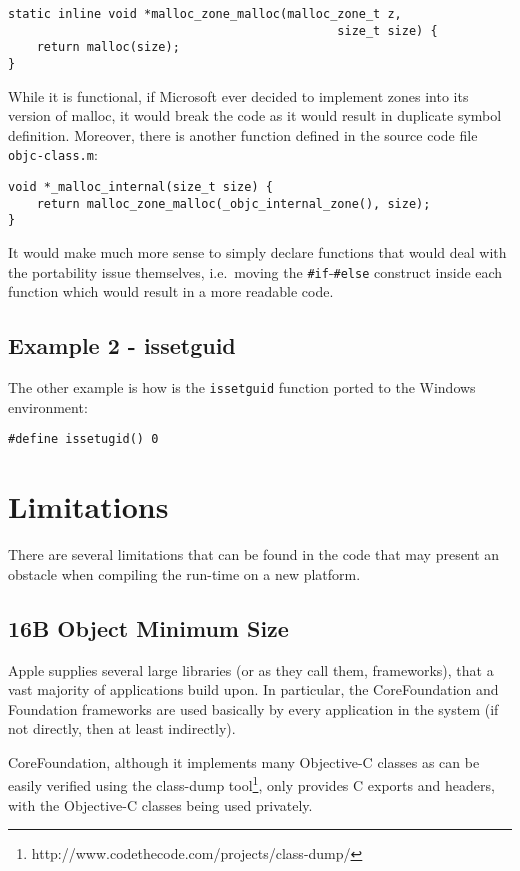 \begin{verbatim}
static inline void *malloc_zone_malloc(malloc_zone_t z, 
                                              size_t size) { 
    return malloc(size); 
}
\end{verbatim}

While it is functional, if Microsoft ever decided to implement zones into its version of malloc, it would break the code as it would result in duplicate symbol definition. Moreover, there is another function defined in the source code file \verb=objc-class.m=:

\begin{verbatim}
void *_malloc_internal(size_t size) {
    return malloc_zone_malloc(_objc_internal_zone(), size);
}
\end{verbatim}

It would make much more sense to simply declare functions that would deal with the portability issue themselves, i.e.\ moving the \verb=#if=-\verb=#else= construct inside each function which would result in a more readable code.

\subsection{Example 2 - issetguid}
The other example is how is the \verb=issetguid= function ported to the Windows environment:

\begin{verbatim}
#define issetugid() 0
\end{verbatim}

\section{Limitations}
There are several limitations that can be found in the code that may present an obstacle when compiling the run-time on a new platform.

\subsection{16B Object Minimum Size}
Apple supplies several large libraries (or as they call them, frameworks), that a vast majority of applications build upon. In particular, the CoreFoundation and Foundation frameworks are used basically by every application in the system (if not directly, then at least indirectly).

CoreFoundation, although it implements many Objective-C classes as can be easily verified using the class-dump tool\footnote{http://www.codethecode.com/projects/class-dump/}, only provides C exports and headers, with the Objective-C classes being used privately.

